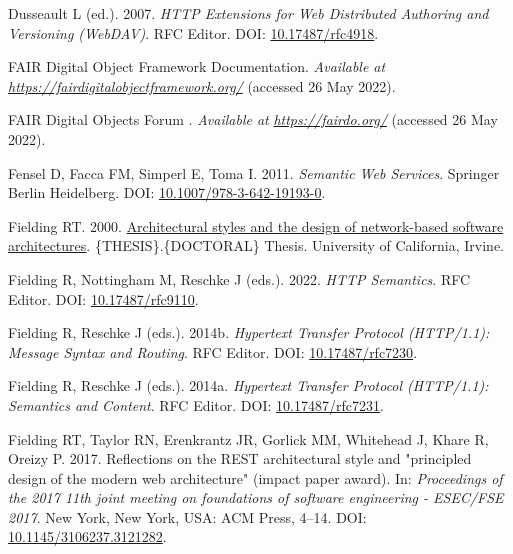 \begin{CSLReferences}{1}{0}
\leavevmode{}%
Dusseault L (ed.). 2007. \emph{HTTP Extensions for Web Distributed Authoring and Versioning (WebDAV)}. RFC Editor. DOI: \href{https://doi.org/10.17487/rfc4918}{10.17487/rfc4918}.

\leavevmode{}%
FAIR Digital Object Framework Documentation. \emph{Available at} \href{https://fairdigitalobjectframework.org/}{\emph{https://fairdigitalobjectframework.org/}} (accessed 26 May 2022).

\leavevmode{}%
FAIR Digital Objects Forum \textbar. \emph{Available at} \href{https://fairdo.org/}{\emph{https://fairdo.org/}} (accessed 26 May 2022).

\leavevmode{}%
Fensel D, Facca FM, Simperl E, Toma I. 2011. \emph{Semantic Web Services}. Springer Berlin Heidelberg. DOI: \href{https://doi.org/10.1007/978-3-642-19193-0}{10.1007/978-3-642-19193-0}.

\leavevmode{}%
Fielding RT. 2000. \href{https://www.ics.uci.edu//~fielding/pubs/dissertation/top.htm}{Architectural styles and the design of network-based software architectures}. \{THESIS\}.\{DOCTORAL\} Thesis. University of California, Irvine.

\leavevmode{}%
Fielding R, Nottingham M, Reschke J (eds.). 2022. \emph{HTTP Semantics}. RFC Editor. DOI: \href{https://doi.org/10.17487/rfc9110}{10.17487/rfc9110}.

\leavevmode{}%
Fielding R, Reschke J (eds.). 2014b. \emph{Hypertext Transfer Protocol (HTTP/1.1): Message Syntax and Routing}. RFC Editor. DOI: \href{https://doi.org/10.17487/rfc7230}{10.17487/rfc7230}.

\leavevmode{}%
Fielding R, Reschke J (eds.). 2014a. \emph{Hypertext Transfer Protocol (HTTP/1.1): Semantics and Content}. RFC Editor. DOI: \href{https://doi.org/10.17487/rfc7231}{10.17487/rfc7231}.

\leavevmode{}%
Fielding RT, Taylor RN, Erenkrantz JR, Gorlick MM, Whitehead J, Khare R, Oreizy P. 2017. Reflections on the REST architectural style and "principled design of the modern web architecture" (impact paper award). In: \emph{Proceedings of the 2017 11th joint meeting on foundations of software engineering - ESEC/FSE 2017}. New York, New York, USA: ACM Press, 4--14. DOI: \href{https://doi.org/10.1145/3106237.3121282}{10.1145/3106237.3121282}.


\end{CSLReferences}

